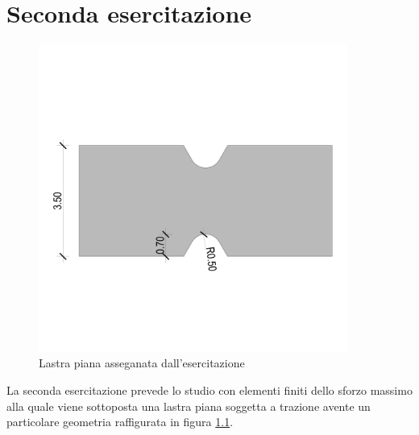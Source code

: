 \chapter{Seconda esercitazione}
\begin{figure}[htb]
    \centering
    \includegraphics[width=0.9\textwidth]{rel2/img2/2Lastra.pdf}
    \caption{Lastra piana asseganata dall'esercitazione}
    \label{fig:lastraIniziale}
\end{figure}
La seconda esercitazione prevede lo studio con elementi finiti dello sforzo massimo alla quale viene sottoposta una lastra piana soggetta a trazione avente un particolare geometria raffigurata in figura \ref{fig:lastraIniziale}.


